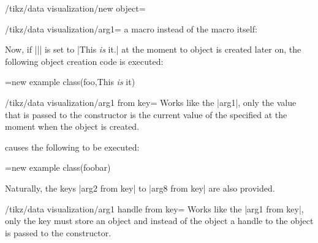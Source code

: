 \begin{key}{/tikz/data visualization/new object=}
\begin{key}{/tikz/data visualization/arg1=}
    a macro instead of the macro itself:
\begin{codeexample}
\end{codeexample}
  Now, if |\bar| is set to |This \emph{is} it.| at the moment to
  object is created later on, the following object creation code is executed:
\begin{codeexample}
\pgfoonew \tikzdvobj=new example class(foo,This \emph{is} it)
\end{codeexample}
  \end{key}

  \begin{key}{/tikz/data visualization/arg1 from key=}
    Works like the |arg1|, only the value that is passed to the
    constructor is the current value of the specified  at
    the moment when the object is created.
\begin{codeexample}
\tikzset{some key/.initial=foobar}
\end{codeexample}
  causes the following to be executed:
\begin{codeexample}
\pgfoonew \tikzdvobj=new example class(foobar)
\end{codeexample}
    Naturally, the keys |arg2 from key| to |arg8 from key| are also
    provided.
  \end{key}

  \begin{key}{/tikz/data visualization/arg1 handle from key=}
    Works like the |arg1 from key|, only the key must store an object
    and instead of the object a handle to the object is passed to the
    constructor.
  \end{key}
\end{key}

